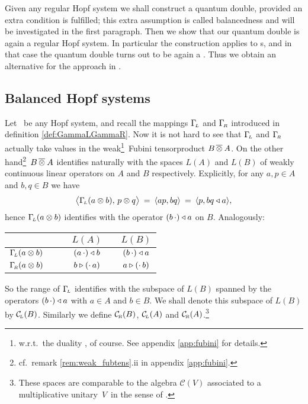
\begin{abs_chp}
Given any regular Hopf system we shall construct a quantum double, provided
an extra condition is fulfilled; this extra assumption is called
balancedness and will be investigated in the first paragraph.
Then we show that our quantum double is again a regular Hopf system.
In particular the construction applies to \mhs s,
and in that case the quantum double turns out to be again a \mhs\@.
Thus we obtain an alternative for the approach in \cite{FonsDra:QD}\@.
\end{abs_chp}



\subsection{Balanced Hopf systems}

Let \pairAB\ be any Hopf system, and recall the mappings $\Gamma_{\!\scriptscriptstyle L}$ and $\Gamma_{\!\scriptscriptstyle R}$
introduced in definition \ref{def:GammaLGammaR}\@.
Now it is not hard to see that $\Gamma_{\!\scriptscriptstyle L}$ and $\Gamma_{\!\scriptscriptstyle R}$ actually take values in the
weak\footnote{w.r.t.\
the duality \pairAB, of course. See appendix \ref{app:fubini} for details.}\
Fubini tensorproduct $B \,\overline{\otimes}\: A$. On the other
hand\footnote{cf.\ remark \ref{rem:weak_fubtens}.ii in appendix \ref{app:fubini}\@.}\
$B \,\overline{\otimes}\: A$ identifies naturally with the spaces $L(A)$ and $L(B)$
of weakly continuous linear operators on $A$ and $B$ respectively.
Explicitly, for any $a,p\in A$ and $b,q\in B$ we have
$$ \pairM{\GamL(a \tens b)}{p \tens q}  \:=\:  \pair{ap}{bq}  \:=\:  \pair{p}{bq \ract a}, $$
hence $\Gamma_{\!\scriptscriptstyle L}(a \otimes b)$ identifies with the operator $(b\,\cdot) \triangleleft a$ on $B$.
Analogously:
\begin{center}
\begin{tabular}{cc|cccc}
&&& $L(A)$   &\hspace{1em}&   $L(B)$
\\ \hline
$\Gamma_{\!\scriptscriptstyle L}(a \otimes b)$  &&&  $(a\,\cdot) \triangleleft b$  && $(b\,\cdot) \triangleleft a$
\vertL\\
$\Gamma_{\!\scriptscriptstyle R}(a \otimes b)$  &&&  $b \triangleright (\cdot\,a)$ && $a \triangleright (\cdot\,b)$
\vertL
\end{tabular}
\end{center}
So the range of $\Gamma_{\!\scriptscriptstyle L}$ identifies with the subspace of $L(B)$ spanned by the operators
$(b\,\cdot) \triangleleft a$ with $a\in A$ and $b\in B$.
We shall denote this subspace of $L(B)$ by $\mathcal{C}_{\scriptscriptstyle \! L}(B)$.
Similarly we define $\mathcal{C}_{\scriptscriptstyle \! R}(B)$, $\mathcal{C}_{\scriptscriptstyle \! L}(A)$ and
$\mathcal{C}_{\scriptscriptstyle \! R}(A)$.\footnote{These spaces are comparable to the algebra $\mathcal{C}(V)$
associated to a multiplicative \mbox{unitary $V$}\ in the sense of \cite{BS}.}


